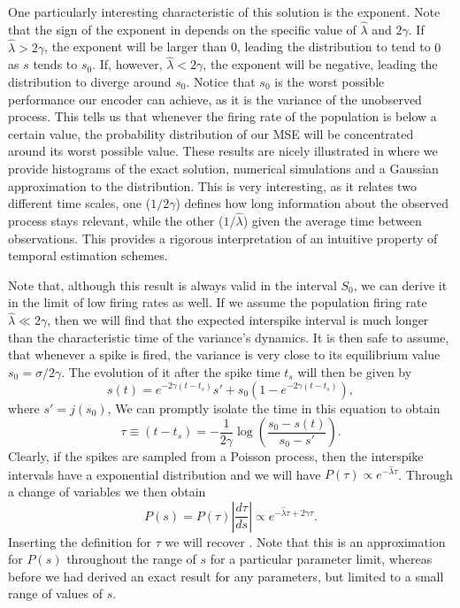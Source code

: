 One particularly interesting characteristic of this solution is the exponent. Note that the sign of the exponent in  depends on the specific value of $\hat{\lambda}$ and $2\gamma$. If $\hat{\lambda} > 2\gamma$, the exponent will be larger than 0, leading the distribution to tend to $0$ as $s$ tends to $s_0$. If, however, $\hat{\lambda} < 2\gamma$, the exponent will be negative, leading the distribution to diverge around $s_0$. Notice that $s_0$ is the worst possible performance our encoder can achieve, as it is the variance of the unobserved process. This tells us that whenever the firing rate of the population is below a certain value, the probability distribution of our MSE will be concentrated around its worst possible value. These results are nicely illustrated in  where we provide histograms of the exact solution, numerical simulations and a Gaussian approximation to the distribution. This is very interesting, as it relates two different time scales, one ($1/2\gamma$) defines how long information about the observed process stays relevant, while the other ($1/\hat{\lambda}$) given the average time between observations. This provides a rigorous interpretation of an intuitive property of temporal estimation schemes.
\par
Note that, although this result is always valid in the interval $S_0$, we can derive it in the limit of low firing rates as well. If we assume the population firing rate $\hat{\lambda} \ll 2\gamma$, then we will find that the expected interspike interval is much longer than the characteristic time of the variance's dynamics. It is then safe to assume, that whenever a spike is fired, the variance is very close to its equilibrium value $s_0 = \sigma/2\gamma$. The evolution of it after the spike time $t_s$ will then be given by
\[
s(t) = e^{-2\gamma(t-t_s)} s' + s_0 \left(1-e^{-2\gamma (t-t_s)}\right),
\]
where $s' = j(s_0)$,
We can promptly isolate the time in this equation to obtain
\[
\tau \equiv (t-t_s) = -\frac{1}{2\gamma} \log\left(\frac{s_0-s(t)}{s_0-s'}\right).
\]
Clearly, if the spikes are sampled from a Poisson process, then the interspike intervals have a exponential distribution and we will have $P(\tau) \propto e^{-\hat{\lambda}\tau}$. Through a change of variables we then obtain
\[
P(s) = P(\tau) \left|\frac{d\tau}{ds}\right| \propto e^{-\hat{\lambda} \tau + 2\gamma \tau}.
\]
Inserting the definition for $\tau$ we will recover . Note that this is an approximation for $P(s)$ throughout the range of $s$ for a particular parameter limit, whereas before we had derived an exact result for any parameters, but limited to a small range of values of $s$.\par

